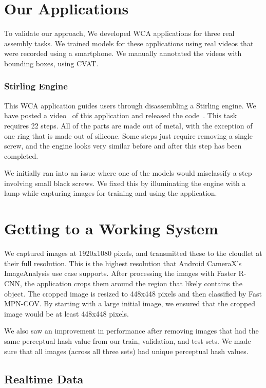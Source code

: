 \section{Our Applications}

To validate our approach, We developed WCA applications for three real assembly
tasks.
We trained models for these applications using real videos that were recorded
using a smartphone.
We manually annotated the videos with bounding boxes, using CVAT.

\subsubsection{Stirling Engine}\label{sec:stirling}

This WCA application guides users through disassembling a
Stirling engine.
We have posted a video~\cite{stirling_youtube} of this application and released
the code~\cite{stirling_github}.
This task requires 22 steps. All of the parts are made out of
metal, with the exception of one ring that is made out of silicone. Some steps
just require removing a single screw, and the engine looks very similar before
and after this step has been completed.

We initially ran into an issue where one of the models would misclassify a step
involving small black screws.
We fixed this by illuminating the engine with a lamp while capturing images for
training and using the application.

\section{Getting to a Working System}

We captured images at 1920x1080 pixels, and transmitted these to the cloudlet at
their full resolution.
This is the highest resolution that Android CameraX's ImageAnalysis use case
supports.
After processing the images with Faster R-CNN, the application crops them around
the region that likely contains the object.
The cropped image is resized to 448x448 pixels and then classified by Fast
MPN-COV.
By starting with a large initial image, we ensured that the cropped image would
be at least 448x448 pixels.

We also saw an improvement in performance after removing images that had the
same perceptual hash value from our train, validation, and test sets. We made
sure that all images (across all three sets) had unique perceptual hash values.

\subsection{Realtime Data}

